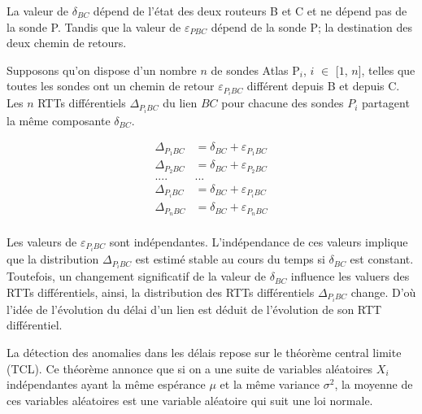 La valeur de  $\delta_{BC}$ dépend de l'état des deux routeurs B et C et ne dépend pas de la sonde P. Tandis que la valeur de $\varepsilon_{PBC}$ dépend de la sonde P; la destination des deux chemin de retours.
 
 Supposons qu'on dispose d'un nombre $n$ de sondes Atlas P$_i$, $i$ $\in$ [$1$, $n$], telles que toutes les sondes ont un chemin de retour  $\varepsilon_{P_{i}BC}$ différent depuis B et depuis C.  Les $n$ RTTs différentiels $\Delta_{P{_i}BC}$ du lien $BC$ pour chacune des sondes $P_i$  partagent la même composante $\delta_{BC}$.
 
 
 \begin{align*}
 \Delta_{P_{1}BC} &= \delta_{BC} + \varepsilon_{P_{1}BC}\\
  \Delta_{P_{2}BC} &= \delta_{BC} + \varepsilon_{P_{2}BC}\\
  .... &   ... \\
   \Delta_{P_{i}BC} &= \delta_{BC} + \varepsilon_{P_{i}BC}\\
      \Delta_{P_{n}BC} &= \delta_{BC} + \varepsilon_{P_{n}BC}\\
 \end{align*}
 
Les valeurs de  $\varepsilon_{P_{i}BC}$ sont  indépendantes. L'indépendance de ces valeurs implique que la distribution $\Delta_{P_{i}BC}$ est estimé  stable au cours du temps si $\delta_{BC}$ est constant. Toutefois, un changement significatif de la valeur de $\delta_{BC}$ influence les valuers des RTTs différentiels, ainsi,  la distribution des RTTs différentiels $\Delta_{P_{i}BC}$ change. D'où l'idée de l'évolution du délai d'un lien est déduit de l'évolution de son RTT différentiel.


La détection des anomalies dans les délais repose sur le théorème  central limite (TCL). Ce théorème  annonce que si on a une suite de variables aléatoires $X_i$ indépendantes ayant la même espérance $\mu$ et la même variance $\sigma^2$, la moyenne de ces variables aléatoires est une variable aléatoire qui suit une loi normale. 




